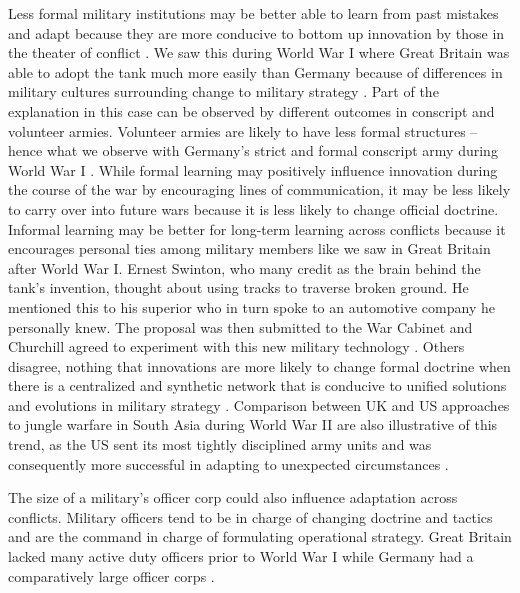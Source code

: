 \documentclass[12pt,letterpaper]{article}
\begin{document}
	Less formal military institutions may be better able to learn from past mistakes and adapt because they are more conducive to bottom up innovation by those in the theater of conflict \citep{kollars_warhorizonsoldierled_2015}. We saw this during World War I where Great Britain was able to adopt the tank much more easily than Germany because of differences in military cultures surrounding change to military strategy \citep{raths_germantankproduction_2011, foley_dumbdonkeyscunning_2014}. Part of the explanation in this case can be observed by different outcomes in conscript and volunteer armies. Volunteer armies are likely to have less formal structures -- hence what we observe with Germany's strict and formal conscript army during World War I \citep{foley_learningwarlessons_2011}. While formal learning may positively influence innovation during the course of the war by encouraging lines of communication, it may be less likely to carry over into future wars because it is less likely to change official doctrine. Informal learning may be better for long-term learning across conflicts because it encourages personal ties among military members like we saw in Great Britain after World War I. Ernest Swinton, who many credit as the brain behind the tank's invention, thought about using tracks to traverse broken ground. He mentioned this to his superior who in turn spoke to an automotive company he personally knew. The proposal was then submitted to the War Cabinet and Churchill agreed to experiment with this new military technology \citep[291-293]{foley_dumbdonkeyscunning_2014}. Others disagree, nothing that innovations are more likely to change formal doctrine when there is a centralized and synthetic network that is conducive to unified solutions and evolutions in military strategy \citep{kollars_warhorizonsoldierled_2015}. Comparison between UK and US approaches to jungle warfare in South Asia during World War II are also illustrative of this trend, as the US sent its most tightly disciplined army units and was consequently more successful in adapting to unexpected circumstances \citep[137]{thiesmeyer_combatscientistsscience_1947}.
	
	The size of a military's officer corp could also influence adaptation across conflicts. Military officers tend to be in charge of changing doctrine and tactics and are the command in charge of formulating operational strategy. Great Britain lacked many active duty officers prior to World War I \citep{simkins_kitchenerarmyraising_2007} while Germany had a comparatively large officer corps \citep[217]{kriegsruestungundkriegswirtschaft_1930}.
	
\end{document}
